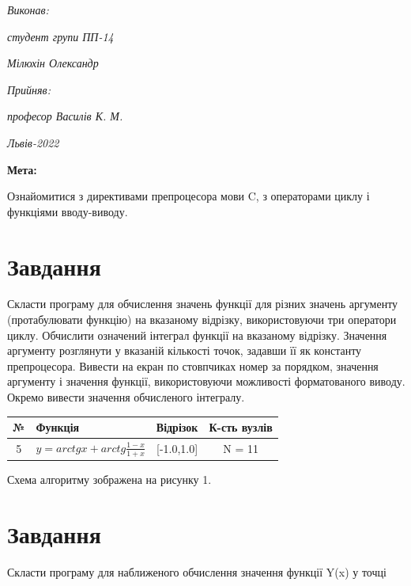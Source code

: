 \documentclass{article}
\begin{document}
\vspace{12.1pt} %
	{\fontsize{14}{22.4}\selectfont
\begin{flushright}
	\textit{Виконав:}

	\textit{студент групи ПП-14}

	\textit{Мілюхін Олександр}

	\textit{Прийняв:}

	\textit{професор Василів К. М.}
\end{flushright}
\vspace{37.4pt} %
\begin{center}
\textit{Львів-2022}
\vspace{37.4pt} %
\end{center}
	}
{\fontsize{14}{16.1}\selectfont
\textbf{Мета:}

Ознайомитися з директивами препроцесора мови C, з операторами циклу і функціями вводу-виводу.

\section{Завдання}

Скласти програму для обчислення значень функції для різних значень
аргументу (протабулювати функцію) на вказаному відрізку, використовуючи
три оператори циклу. Обчислити означений інтеграл функції на вказаному
відрізку. Значення аргументу розглянути у вказаній кількості точок, задавши її
як константу препроцесора. Вивести на екран по стовпчиках номер за порядком,
значення аргументу і значення функції, використовуючи можливості форматованого
виводу. Окремо вивести значення обчисленого інтегралу.

\vspace{.5cm}

\renewcommand{\arraystretch}{1.3}
\begin{tabular}{|c| l| c| c|}
	\hline
	№ & Функція & Відрізок & К-сть вузлів \\
	\hline
	5 & $y=arctgx+arctg\frac{1-x}{1+x}$ & [-1.0,1.0] & N = 11 \\
	\hline
\end{tabular}

\bigskip

Схема алгоритму зображена на рисунку 1.

\section{Завдання}
Скласти програму для наближеного обчислення значення функції Y(x) у точці

}
\end{document}
